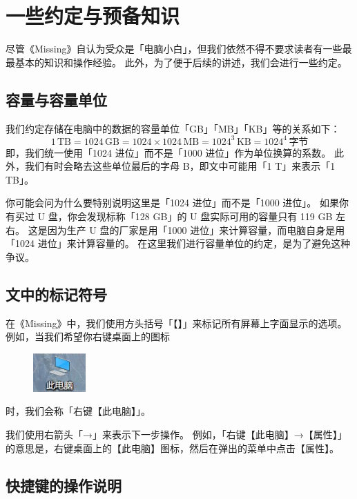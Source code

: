 \setcounter{chapter}{-1}

\chapter{一些约定与预备知识}
\label{first-things-first}

尽管《Missing》自认为受众是「电脑小白」，但我们依然不得不要求读者有一些最最基本的知识和操作经验。
此外，为了便于后续的讲述，我们会进行一些约定。

\section{容量与容量单位}

我们约定存储在电脑中的数据的容量单位「GB」「MB」「KB」等的关系如下：
\[1\,\mathrm{TB}=1024\,\mathrm{GB}=1024\times1024\,\mathrm{MB}=1024^3\,\mathrm{KB}=1024^4\,\text{字节}\]
即，我们统一使用「1024 进位」而不是「1000 进位」作为单位换算的系数。
此外，我们有时会略去这些单位最后的字母 B，即文中可能用「1 T」来表示「1 TB」。

你可能会问为什么要特别说明这里是「1024 进位」而不是「1000 进位」。
如果你有买过 U 盘，你会发现标称「128 GB」的 U 盘实际可用的容量只有 119 GB 左右。
这是因为生产 U 盘的厂家是用「1000 进位」来计算容量，而电脑自身是用「1024 进位」来计算容量的。
在这里我们进行容量单位的约定，是为了避免这种争议。

\section{文中的标记符号}

在《Missing》中，我们使用方头括号「【】」来标记所有屏幕上字面显示的选项。
例如，当我们希望你右键桌面上的图标
\begin{figure}[htb!]
  \centering
  \includegraphics[width=2cm]{assets/This_PC.jpg}
\end{figure}

\noindent 时，我们会称「右键【此电脑】」。

我们使用右箭头「→」来表示下一步操作。
例如，「右键【此电脑】→【属性】」的意思是，右键桌面上的【此电脑】图标，然后在弹出的菜单中点击【属性】。

\section{快捷键的操作说明}

